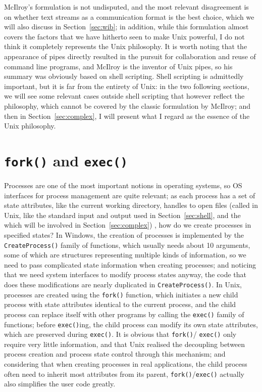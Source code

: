 McIlroy's formulation is not undisputed, and the most relevant disagreement is
on whether text streams as a communication format is the best choice, which we
will also discuss in Section~\ref{sec:wib}; in addition, while this formulation
almost covers the factors that we have hitherto seen to make Unix powerful,
I do not think it completely represents the Unix philosophy.  It is worth
noting that the appearance of pipes directly resulted in the pursuit for
collaboration and reuse of command line programs, and
McIlroy is the inventor of Unix pipes, so his summary was obviously based on
shell scripting.  Shell scripting is admittedly important, but it is far
from the entirety of Unix: in the two following sections, we will see
some relevant cases outside shell scripting that however reflect the
philosophy, which cannot be covered by the classic formulation by
McIlroy; and then in Section~\ref{sec:complex}, I will present
what I regard as the essence of the Unix philosophy.

\section{\texttt{fork()} and \texttt{exec()}}\label{sec:exec}

Processes are one of the most important notions in operating systems, so OS
interfaces for process management are quite relevant; as each process has a
set of state attributes, like the current working directory, handles to open
files (called  in Unix, like the standard input and
output used in Section~\ref{sec:shell}, and the 
which will be involved in Section~\ref{sec:complex}) \etc, how do we create
processes in specified states?  In Windows, the creation of processes is
implemented by the \verb|CreateProcess()| family of functions, which usually
needs about 10 arguments, some of which are structures representing multiple
kinds of information, so we need to pass complicated state information when
creating processes; and noticing that we need system interfaces to modify
process states anyway, the code that does these modifications are nearly
duplicated in \verb|CreateProcess()|.  In Unix, processes are created using
the \verb|fork()| function, which initiates a new child process with state
attributes identical to the current process, and the child process can replace
itself with other programs by calling the \verb|exec()| family of functions;
before \verb|exec()|ing, the child process can modify its own state attributes,
which are preserved during \verb|exec()|.  It is obvious that \verb|fork()|/%
\verb|exec()| only require very little information, and that Unix realised the
decoupling between process creation and process state control through this
mechanism; and considering that when creating processes in real applications,
the child process often need to inherit most attributes from its parent,
\verb|fork()|/\verb|exec()| actually also simplifies the user code greatly.

